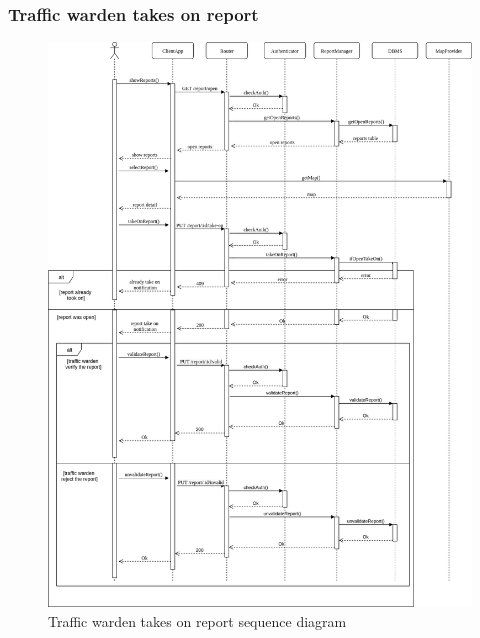 \documentclass{article}
\begin{document}
\subsubsection{Traffic warden takes on report}
\label{sec:traffic-warden}
\begin{figure}[h!]
\centering
	\includegraphics[width=1.0\textwidth]{images/traffic-warden-report.png}
	\caption{Traffic warden takes on report sequence diagram}
	\label{fig:traffic-warden-sequence}
\end{figure}

\newpage
\end{document}
